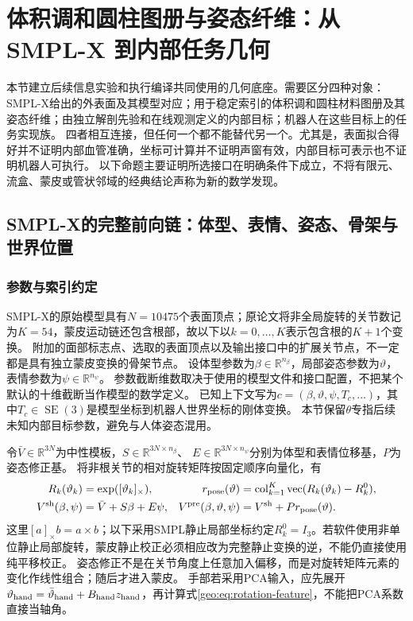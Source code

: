 \documentclass[11pt,a4paper]{article}
\numberwithin{equation}{section}
\theoremstyle{definition}
\DeclareMathOperator{\SE}{SE}
\newcommand{\R}{\mathbb R}
\begin{document}
\section{体积调和圆柱图册与姿态纤维：从 SMPL-X 到内部任务几何}
\label{geo:sec:geometry}

本节建立后续信息实验和执行编译共同使用的几何底座。需要区分四种对象：
SMPL-X给出的外表面及其模型对应；用于稳定索引的体积调和圆柱材料图册及其姿态纤维；由独立解剖先验和在线观测定义的内部目标；机器人在这些目标上的任务实现族。
四者相互连接，但任何一个都不能替代另一个。尤其是，表面拟合得好并不证明内部血管准确，坐标可计算并不证明声窗有效，内部目标可表示也不证明机器人可执行。
以下命题主要证明所选接口在明确条件下成立，不将有限元、流盒、蒙皮或管状邻域的经典结论声称为新的数学发现。

\subsection{SMPL-X的完整前向链：体型、表情、姿态、骨架与世界位置}
\label{geo:sub:smplx}

\subsubsection{参数与索引约定}
SMPL-X的原始模型具有$N=10475$个表面顶点；原论文将非全局旋转的关节数记为$K=54$，蒙皮运动链还包含根部，故以下以$k=0,\ldots,K$表示包含根的$K+1$个变换\cite{smplx2019}。
附加的面部标志点、选取的表面顶点以及输出接口中的扩展关节点，不一定都是具有独立蒙皮变换的骨架节点。
设体型参数为$\beta\in\R^{n_\beta}$，局部姿态参数为$\vartheta$，表情参数为$\psi\in\R^{n_\psi}$。
参数截断维数取决于使用的模型文件和接口配置，不把某个默认的十维截断当作模型的数学定义。
已知上下文写为$c=(\beta,\vartheta,\psi,T_c,\ldots)$，其中$T_c\in\SE(3)$是模型坐标到机器人世界坐标的刚体变换。
本节保留$\theta$专指后续未知内部目标参数，避免与人体姿态混用。

令$\bar V\in\R^{3N}$为中性模板，$S\in\R^{3N\times n_\beta}$、
$E\in\R^{3N\times n_\psi}$分别为体型和表情位移基，$P$为姿态修正基。
将非根关节的相对旋转矩阵按固定顺序向量化，有
\begin{align}
 R_k(\vartheta_k)&=\exp([\vartheta_k]_\times),
 &r_{\rm pose}(\vartheta)&=\operatorname{col}_{k=1}^{K}
      \operatorname{vec}(R_k(\vartheta_k)-R_k^0),
 \label{geo:eq:rotation-feature}\\
 V^{\rm sh}(\beta,\psi)&=\bar V+S\beta+E\psi,
 &V^{\rm pre}(\beta,\vartheta,\psi)&=V^{\rm sh}+Pr_{\rm pose}(\vartheta).
 \label{geo:eq:pre-skin}
\end{align}
这里$[a]_\times b=a\times b$；以下采用SMPL静止局部坐标约定$R_k^0=I_3$。若软件使用非单位静止局部旋转，蒙皮静止校正必须相应改为完整静止变换的逆，不能仍直接使用纯平移校正。
姿态修正不是在关节角度上任意加入偏移，而是对旋转矩阵元素的变化作线性组合；随后才进入蒙皮。
手部若采用PCA输入，应先展开$\vartheta_{\rm hand}=\bar\vartheta_{\rm hand}+B_{\rm hand}z_{\rm hand}$，再计算式\eqref{geo:eq:rotation-feature}，不能把PCA系数直接当轴角。
\end{document}
